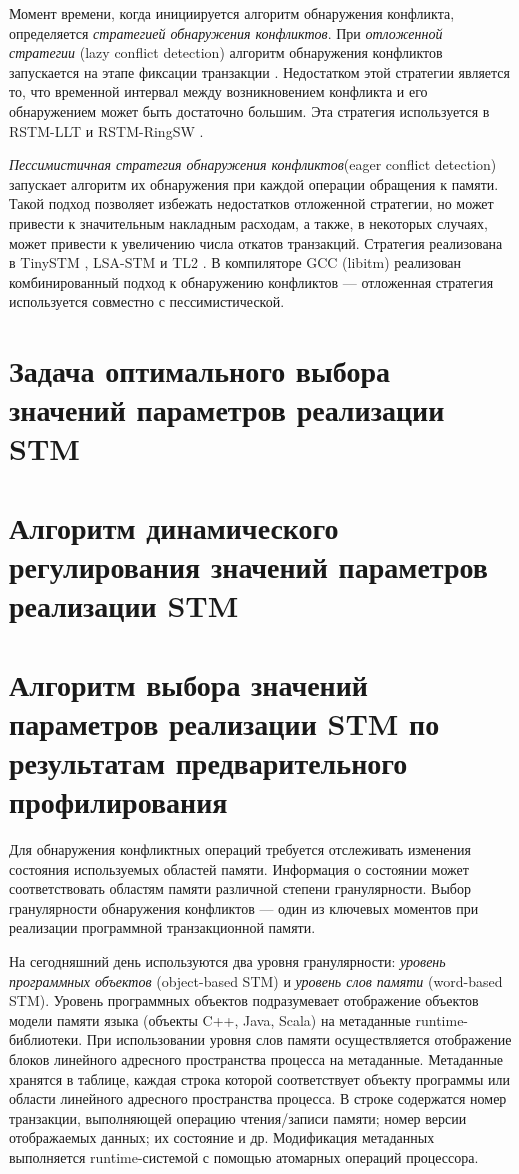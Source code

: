 Момент времени, когда инициируется алгоритм обнаружения конфликта, определяется 
\textit{стратегией обнаружения конфликтов}. При \textit{отложенной стратегии} 
(lazy conflict detection) алгоритм обнаружения конфликтов запускается на этапе 
фиксации транзакции \cite{spear_ringstm}. Недостатком этой стратегии является 
то, что временной интервал между возникновением конфликта и его обнаружением 
может быть достаточно большим. Эта стратегия используется в RSTM-LLT 
\cite{rstm_proj} и RSTM-RingSW \cite{rstm_proj, spear_strategy_for_cm, 
spear_ringstm}. 

\textit{Пессимистичная стратегия обнаружения конфликтов}(eager conflict 
detection) запускает алгоритм их обнаружения при каждой операции обращения к 
памяти. Такой подход позволяет избежать недостатков отложенной стратегии, но 
может привести к значительным накладным расходам, а также, в некоторых случаях, 
может привести к увеличению числа откатов транзакций. Стратегия реализована в 
TinySTM \cite{felber_fetzer_marlier_riegel}, LSA-STM \cite{riegel_felber_fetzer} 
и TL2 \cite{dice_shavit_tl2}. В компиляторе GCC (libitm) реализован 
комбинированный подход к обнаружению конфликтов --- отложенная стратегия 
используется совместно с пессимистической.

\section{Задача оптимального выбора значений параметров реализации STM}
\section{Алгоритм динамического регулирования значений параметров
  реализации STM}
\section{Алгоритм выбора значений параметров реализации STM по результатам
  предварительного профилирования}

Для обнаружения конфликтных операций требуется отслеживать изменения состояния 
используемых областей памяти. Информация о состоянии может соответствовать 
областям памяти различной степени гранулярности. Выбор гранулярности обнаружения 
конфликтов --- один из ключевых моментов при реализации программной 
транзакционной памяти.

На сегодняшний день используются два уровня гранулярности: \textit{уровень 
программных объектов} (object-based STM) и \textit{уровень слов памяти} 
(word-based STM). Уровень программных объектов подразумевает отображение 
объектов модели памяти языка (объекты C++, Java, Scala) на метаданные 
runtime-библиотеки. При использовании уровня слов памяти осуществляется 
отображение блоков линейного адресного пространства процесса на метаданные. 
Метаданные хранятся в таблице, каждая строка которой соответствует объекту 
программы или области линейного адресного пространства процесса. В строке 
содержатся номер транзакции, выполняющей операцию чтения/записи памяти; номер 
версии  отображаемых данных; их состояние и др. Модификация метаданных 
выполняется runtime-системой с помощью атомарных операций процессора.

